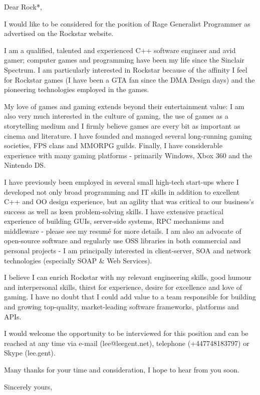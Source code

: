 \documentclass[a4paper,11pt]{letter}
\begin{document}
\begin{letter}{}
\opening{Dear Rock*,}

I would like to be considered for the position of Rage Generalist Programmer as advertised on the Rockstar website.

I am a qualified, talented and experienced C++ software engineer and avid gamer; computer games and programming have been my life since the Sinclair Spectrum.  I am particularly interested in Rockstar because of the affinity I feel for Rockstar games (I have been a GTA fan since the DMA Design days) and the pioneering technologies employed in the games.

My love of games and gaming extends beyond their entertainment value: I am also very much interested in the culture of gaming, the use of games as a storytelling medium and I firmly believe games are every bit as important as cinema and literature.  I have founded and managed several long-running gaming societies, FPS clans and MMORPG guilds.  Finally, I have considerable experience with many gaming platforms - primarily Windows, Xbox 360 and the Nintendo DS.

I have previously been employed in several small high-tech start-ups where I developed not only broad programming and IT skills in addition to excellent C++ and OO design experience, but an agility that was critical to our business's success as well as keen problem-solving skills.  I have extensive practical experience of building GUIs, server-side systems, RPC mechanisms and middleware - please see my resum\'{e} for more details.  I am also an advocate of open-source software and regularly use OSS libraries in both commercial and personal projects - I am principally interested in client-server, SOA and network technologies (especially SOAP \& Web Services).

I believe I can enrich Rockstar with my relevant engineering skills, good humour and interpersonal skills, thirst for experience, desire for excellence and love of gaming.  I have no doubt that I could add value to a team responsible for building and growing top-quality, market-leading software frameworks, platforms and APIs.

I would welcome the opportunity to be interviewed for this position and can be reached at any time via e-mail (lee@leegent.net), telephone (+447748183797) or Skype (lee.gent).

Many thanks for your time and consideration, I hope to hear from you soon.
\closing{Sincerely yours,\\
 \\
}

\end{letter}
\end{document}
